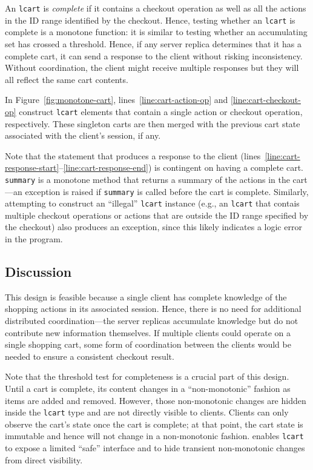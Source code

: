 An \texttt{lcart} is \emph{complete} if it contains a checkout operation as well
as all the actions in the ID range identified by the checkout. Hence, testing
whether an \texttt{lcart} is complete is a monotone function: it is similar to
testing whether an accumulating set has crossed a threshold. Hence, if any
server replica determines that it has a complete cart, it can send a response to
the client without risking inconsistency. Without coordination, the client might
receive multiple responses but they will all reflect the same cart contents.

In Figure~\ref{fig:monotone-cart}, lines~\ref{line:cart-action-op} and
\ref{line:cart-checkout-op} construct \texttt{lcart} elements that contain a
single action or checkout operation, respectively. These singleton carts are
then merged with the previous cart state associated with the client's session,
if any.

Note that the statement that produces a response to the client
(lines~\ref{line:cart-response-start}--\ref{line:cart-response-end}) is
contingent on having a complete cart. \texttt{summary} is a monotone method that
returns a summary of the actions in the cart---an exception is raised if
\texttt{summary} is called before the cart is complete. Similarly, attempting to
construct an ``illegal'' \texttt{lcart} instance (e.g., an \texttt{lcart} that
contais multiple checkout operations or actions that are outside the ID range
specified by the checkout) also produces an exception, since this likely
indicates a logic error in the program.

\subsection{Discussion}
This design is feasible because a single client has complete knowledge of the
shopping actions in its associated session. Hence, there is no need for
additional distributed coordination---the server replicas accumulate knowledge
but do not contribute new information themselves. If multiple clients could
operate on a single shopping cart, some form of coordination between the clients
would be needed to ensure a consistent checkout result.

Note that the threshold test for completeness is a crucial part of this
design. Until a cart is complete, its content changes in a ``non-monotonic''
fashion as items are added and removed. However, those non-monotonic changes are
hidden inside the \texttt{lcart} type and are not directly visible to
clients. Clients can only observe the cart's state once the cart is complete; at
that point, the cart state is immutable and hence will not change in a
non-monotonic fashion. \lang enables \texttt{lcart} to expose a limited ``safe''
interface and to hide transient non-monotonic changes from direct visibility.

